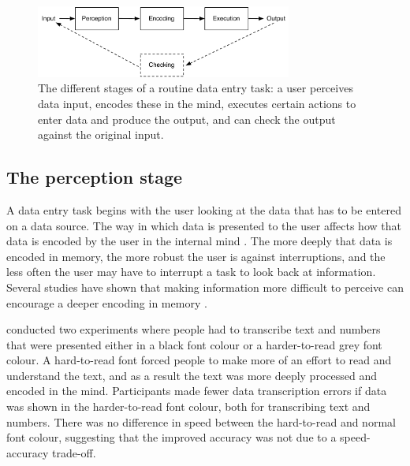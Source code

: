 \begin{figure}[!ht]
\centering
\includegraphics[width=0.75\textwidth]{images/background/HIP.pdf}
\caption[Different stages of a data entry task]{The different stages of a routine data entry task: a user perceives data input, encodes these in the mind, executes certain actions to enter data and produce the output, and can check the output against the original input.}
\vspace{-3pt}
\label{fig:ch2_hip}
\end{figure}

\subsection{The perception stage}
A data entry task begins with the user looking at the data that has to be entered on a data source.  The way in which data is presented to the user affects how that data is encoded by the user in the internal mind \citep{Hollan2000, Hutchins1995}. The more deeply that data is encoded in memory, the more robust the user is against interruptions, and the less often the user may have to interrupt a task to look back at information. Several studies have shown that making information more difficult to perceive can encourage a deeper encoding in memory \citep{Diemand-Yauman2011, Soboczenski2013}.

\citet{Soboczenski2013} conducted two experiments where people had to transcribe text and numbers that were presented either in a black font colour or a harder-to-read grey font colour. A hard-to-read font forced people to make more of an effort to read and understand the text, and as a result the text was more deeply processed and encoded in the mind. Participants made fewer data transcription errors if data was shown in the harder-to-read font colour, both for transcribing text and numbers. There was no difference in speed between the hard-to-read and normal font colour, suggesting that the improved accuracy was not due to a speed-accuracy trade-off. 

